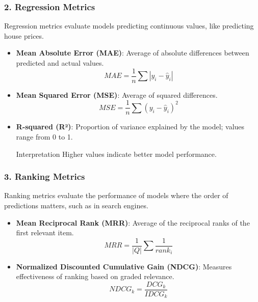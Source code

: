 \documentclass{beamer}
\begin{document}
\begin{frame}[fragile]
    \frametitle{2. Regression Metrics}
    Regression metrics evaluate models predicting continuous values, like predicting house prices.

    \begin{itemize}
        \item \textbf{Mean Absolute Error (MAE)}: Average of absolute differences between predicted and actual values.
        \begin{equation}
            MAE = \frac{1}{n} \sum |y_i - \hat{y}_i|
        \end{equation}
        
        \item \textbf{Mean Squared Error (MSE)}: Average of squared differences.
        \begin{equation}
            MSE = \frac{1}{n} \sum (y_i - \hat{y}_i)^2
        \end{equation}
        
        \item \textbf{R-squared (R²)}: Proportion of variance explained by the model; values range from 0 to 1.
        \begin{block}{Interpretation}
            Higher values indicate better model performance.
        \end{block}
    \end{itemize}
\end{frame}

\begin{frame}[fragile]
    \frametitle{3. Ranking Metrics}
    Ranking metrics evaluate the performance of models where the order of predictions matters, such as in search engines.

    \begin{itemize}
        \item \textbf{Mean Reciprocal Rank (MRR)}: Average of the reciprocal ranks of the first relevant item.
        \begin{equation}
            MRR = \frac{1}{|Q|} \sum \frac{1}{rank_i}
        \end{equation}
        
        \item \textbf{Normalized Discounted Cumulative Gain (NDCG)}: Measures effectiveness of ranking based on graded relevance.
        \begin{equation}
            NDCG_k = \frac{DCG_k}{IDCG_k}
        \end{equation}
    \end{itemize}
\end{frame}
\end{document}
